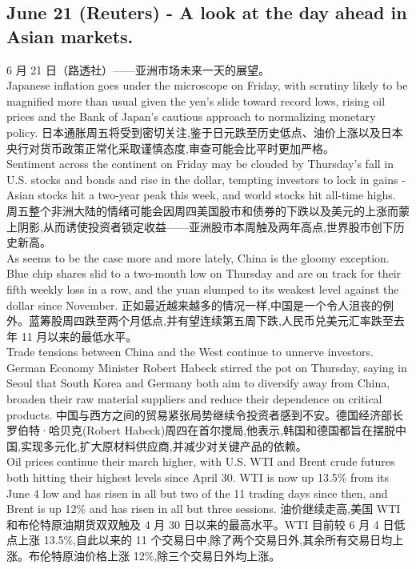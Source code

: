 \documentclass[a4paper,12pt]{article}
\begin{document}
\subsection{June 21 (Reuters) - A look at the day ahead in Asian markets.}
6 月 21 日（路透社）——亚洲市场未来一天的展望。
\\Japanese inflation goes under the microscope on Friday, with scrutiny likely to be magnified more than usual given the yen's slide toward record lows, rising oil prices and the Bank of Japan's cautious approach to normalizing monetary policy.
日本通胀周五将受到密切关注,鉴于日元跌至历史低点、油价上涨以及日本央行对货币政策正常化采取谨慎态度,审查可能会比平时更加严格。
\\Sentiment across the continent on Friday may be clouded by Thursday's fall in U.S. stocks and bonds and rise in the dollar, tempting investors to lock in gains - Asian stocks hit a two-year peak this week, and world stocks hit all-time highs.
周五整个非洲大陆的情绪可能会因周四美国股市和债券的下跌以及美元的上涨而蒙上阴影,从而诱使投资者锁定收益——亚洲股市本周触及两年高点,世界股市创下历史新高。
\\As seems to be the case more and more lately, China is the gloomy exception. Blue chip shares slid to a two-month low on Thursday and are on track for their fifth weekly loss in a row, and the yuan slumped to its weakest level against the dollar since November.
正如最近越来越多的情况一样,中国是一个令人沮丧的例外。蓝筹股周四跌至两个月低点,并有望连续第五周下跌,人民币兑美元汇率跌至去年 11 月以来的最低水平。
\\Trade tensions between China and the West continue to unnerve investors. German Economy Minister Robert Habeck stirred the pot on Thursday, saying in Seoul that South Korea and Germany both aim to diversify away from China, broaden their raw material suppliers and reduce their dependence on critical products.
中国与西方之间的贸易紧张局势继续令投资者感到不安。德国经济部长罗伯特·哈贝克(Robert Habeck)周四在首尔搅局,他表示,韩国和德国都旨在摆脱中国,实现多元化,扩大原材料供应商,并减少对关键产品的依赖。
\\Oil prices continue their march higher, with U.S. WTI and Brent crude futures both hitting their highest levels since April 30. WTI is now up 13.5\% from its June 4 low and has risen in all but two of the 11 trading days since then, and Brent is up 12\% and has risen in all but three sessions.
油价继续走高,美国 WTI 和布伦特原油期货双双触及 4 月 30 日以来的最高水平。WTI 目前较 6 月 4 日低点上涨 13.5\%,自此以来的 11 个交易日中,除了两个交易日外,其余所有交易日均上涨。布伦特原油价格上涨 12\%,除三个交易日外均上涨。
\end{document}
